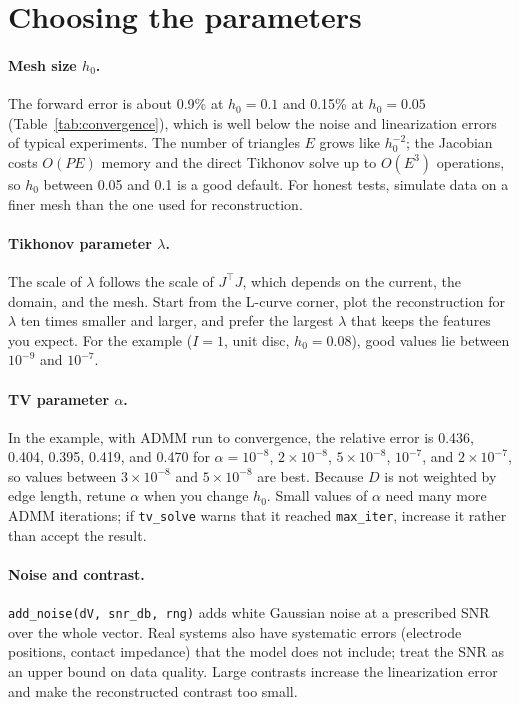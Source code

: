\documentclass[11pt,a4paper]{article}
\newcommand{\code}[1]{\texttt{#1}}
\begin{document}
\section{Choosing the parameters}\label{sec:parameters}

\paragraph{Mesh size $h_0$.} The forward error is about 0.9\% at $h_0=0.1$
and 0.15\% at $h_0=0.05$ (Table~\ref{tab:convergence}), which is well below
the noise and linearization errors of typical experiments. The number of
triangles $E$ grows like $h_0^{-2}$; the Jacobian costs $O(PE)$ memory and the
direct Tikhonov solve up to $O(E^3)$ operations, so $h_0$ between 0.05 and
0.1 is a good default. For honest tests, simulate data on a finer mesh than
the one used for reconstruction.

\paragraph{Tikhonov parameter $\lambda$.} The scale of $\lambda$ follows the
scale of $J^\top J$, which depends on the current, the domain, and the mesh.
Start from the L-curve corner, plot the reconstruction for $\lambda$ ten
times smaller and larger, and prefer the largest $\lambda$ that keeps the
features you expect. For the example ($I=1$, unit disc, $h_0=0.08$), good
values lie between $10^{-9}$ and $10^{-7}$.

\paragraph{TV parameter $\alpha$.} In the example, with ADMM run to
convergence, the relative error is 0.436, 0.404, 0.395, 0.419, and 0.470 for
$\alpha = 10^{-8}$, $2\times10^{-8}$, $5\times10^{-8}$, $10^{-7}$, and
$2\times10^{-7}$, so values between $3\times10^{-8}$ and $5\times10^{-8}$ are
best. Because $D$ is not weighted by edge length, retune $\alpha$ when you
change $h_0$. Small values of $\alpha$ need many more ADMM iterations; if
\code{tv\_solve} warns that it reached \code{max\_iter}, increase it rather
than accept the result.

\paragraph{Noise and contrast.} \code{add\_noise(dV, snr\_db, rng)} adds
white Gaussian noise at a prescribed SNR over the whole vector. Real systems
also have systematic errors (electrode positions, contact impedance) that the
model does not include; treat the SNR as an upper bound on data quality.
Large contrasts increase the linearization error and make the reconstructed
contrast too small.
\end{document}

